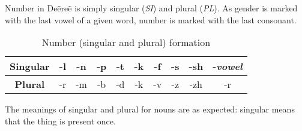 Number in Deẽreẽ is simply singular (\emph{SI}) and plural (\emph{PL}). As gender is marked with the
last vowel of a given word, number is marked with the last consonant.

\begin{table}[h]\label{tab:morph-number}
\begin{center}
\begin{tabular}{|c|ccccccccc|}
\hline
\textbf{Singular} & -l & -n & -p & -t & -k & -f & -s & -sh & -\emph{vowel}\\\hline
\textbf{Plural}   & -r & -m & -b & -d & -k & -v & -z & -zh & -r\\\hline
\end{tabular}
\end{center}
\caption{Number (singular and plural) formation}
\end{table}

The meanings of singular and plural for nouns are as expected: singular means that the thing is
present once.

